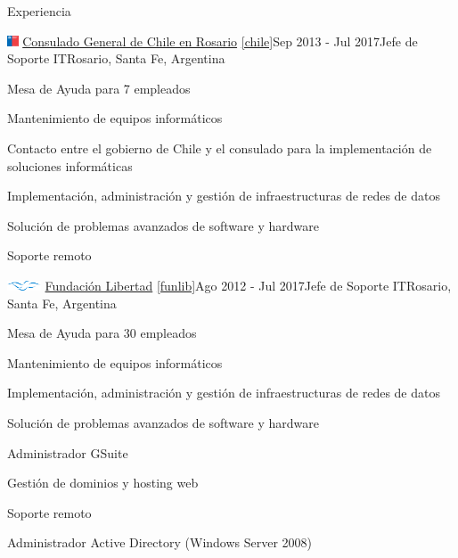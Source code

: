 \documentclass{resume} %
\begin{document}
\begin{rSection}{Experiencia}

    \begin{rSubsection}{\includegraphics[height=0.3cm]{images/minrel-chile.png} \href{https://chile.gob.cl/rosario/}{Consulado General de Chile en Rosario} \ref{chile}}{Sep 2013 - Jul 2017}{Jefe de Soporte IT}{Rosario, Santa Fe, Argentina}

        \item Mesa de Ayuda para 7 empleados
        \item Mantenimiento de equipos informáticos
        \item Contacto entre el gobierno de Chile y el consulado para la implementación de soluciones informáticas
        \item Implementación, administración y gestión de infraestructuras de redes de datos
        \item Solución de problemas avanzados de software y hardware
        \item Soporte remoto
    \end{rSubsection}


    \begin{rSubsection}{\includegraphics[height=0.3cm]{images/fl.png} \href{https://libertad.org.ar/}{Fundación Libertad} \ref{funlib}}{Ago 2012 - Jul 2017}{Jefe de Soporte IT}{Rosario, Santa Fe, Argentina}
        \item Mesa de Ayuda para 30 empleados
        \item Mantenimiento de equipos informáticos
        \item Implementación, administración y gestión de infraestructuras de redes de datos
        \item Solución de problemas avanzados de software y hardware
        \item Administrador GSuite
        \item Gestión de dominios y hosting web
        \item Soporte remoto
        \item Administrador Active Directory (Windows Server 2008)
    \end{rSubsection}


\end{rSection}
\end{document}
